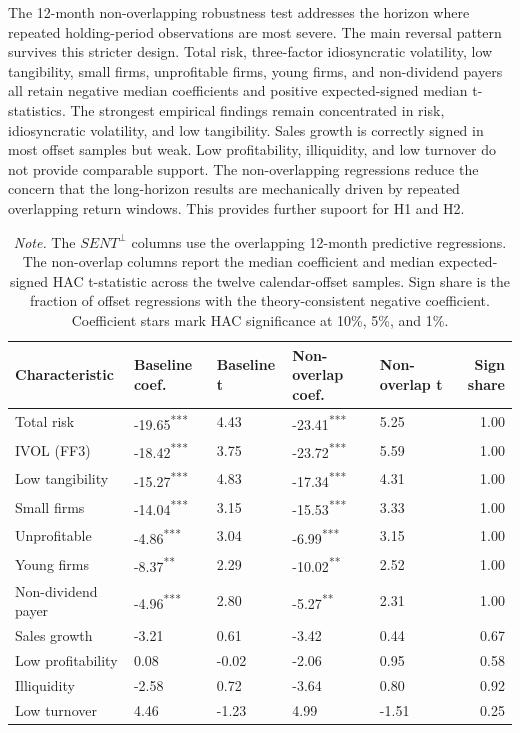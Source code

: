 \documentclass[11pt]{article}
\newcommand{\var}[1]{\ensuremath{#1}}
\newcommand{\tablenote}[1]{\caption*{\footnotesize \textit{Note.} #1}}
\begin{document}
The 12-month non-overlapping robustness test addresses the horizon where repeated holding-period observations are most severe. The main reversal pattern survives this stricter design. Total risk, three-factor idiosyncratic volatility, low tangibility, small firms, unprofitable firms, young firms, and non-dividend payers all retain negative median coefficients and positive expected-signed median t-statistics. The strongest empirical findings remain concentrated in risk, idiosyncratic volatility, and low tangibility. Sales growth is correctly signed in most offset samples but weak. Low profitability, illiquidity, and low turnover do not provide comparable support. The non-overlapping regressions reduce the concern that the long-horizon results are mechanically driven by repeated overlapping return windows. This provides further supoort for H1 and H2.

\begin{table}[H]
    \centering
    \caption{Persistence robustness: 12-month non-overlapping horizon regressions}
    \label{tab:nonoverlap_robustness}
    \small
    \begin{tabular}{lllllr}
        \toprule
        Characteristic & Baseline coef. & Baseline t & Non-overlap coef. & Non-overlap t & Sign share \\
        \midrule
        Total risk & -19.65\textsuperscript{***} & 4.43 & -23.41\textsuperscript{***} & 5.25 & 1.00 \\
        IVOL (FF3) & -18.42\textsuperscript{***} & 3.75 & -23.72\textsuperscript{***} & 5.59 & 1.00 \\
        Low tangibility & -15.27\textsuperscript{***} & 4.83 & -17.34\textsuperscript{***} & 4.31 & 1.00 \\
        Small firms & -14.04\textsuperscript{***} & 3.15 & -15.53\textsuperscript{***} & 3.33 & 1.00 \\
        Unprofitable & -4.86\textsuperscript{***} & 3.04 & -6.99\textsuperscript{***} & 3.15 & 1.00 \\
        Young firms & -8.37\textsuperscript{**} & 2.29 & -10.02\textsuperscript{**} & 2.52 & 1.00 \\
        Non-dividend payer & -4.96\textsuperscript{***} & 2.80 & -5.27\textsuperscript{**} & 2.31 & 1.00 \\
        Sales growth & -3.21 & 0.61 & -3.42 & 0.44 & 0.67 \\
        Low profitability & 0.08 & -0.02 & -2.06 & 0.95 & 0.58 \\
        Illiquidity & -2.58 & 0.72 & -3.64 & 0.80 & 0.92 \\
        Low turnover & 4.46 & -1.23 & 4.99 & -1.51 & 0.25 \\
        \bottomrule
    \end{tabular}
    \tablenote{The \var{SENT^{\perp}} columns use the overlapping 12-month predictive regressions. The non-overlap columns report the median coefficient and median expected-signed HAC t-statistic across the twelve calendar-offset samples. Sign share is the fraction of offset regressions with the theory-consistent negative coefficient. Coefficient stars mark HAC significance at 10\%, 5\%, and 1\%.}
\end{table}
\end{document}
